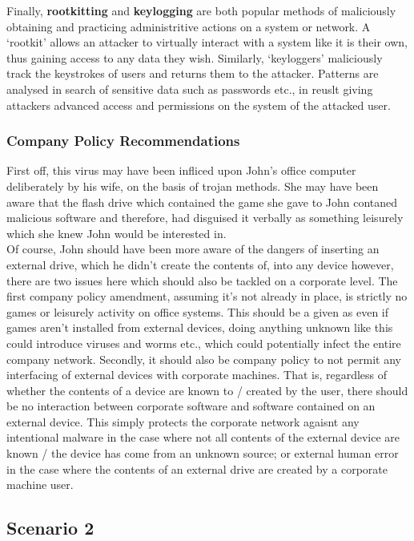 \documentclass[11pt, english]{article}
\begin{document}
	Finally, \textbf{rootkitting} and \textbf{keylogging} are both popular methods of maliciously obtaining and practicing administritive actions on a system or network. A `rootkit' allows an attacker to virtually interact with a system like it is their own, thus gaining access to any data they wish. Similarly, `keyloggers' maliciously track the keystrokes of users and returns them to the attacker. Patterns are analysed in search of sensitive data such as passwords etc., in reuslt giving attackers advanced access and permissions on the system of the attacked user.

		\subsubsection{Company Policy Recommendations}

	First off, this virus may have been infliced upon John's office computer deliberately by his wife, on the basis of trojan methods. She may have been aware that the flash drive which contained the game she gave to John contaned malicious software and therefore, had disguised it verbally as something leisurely which she knew John would be interested in.\\

	Of course, John should have been more aware of the dangers of inserting an external drive, which he didn't create the contents of, into any device however, there are two issues here which should also be tackled on a corporate level. The first company policy amendment, assuming it's not already in place, is strictly no games or leisurely activity on office systems. This should be a given as even if games aren't installed from external devices, doing anything unknown like this could introduce viruses and worms etc., which could potentially infect the entire company network. Secondly, it should also be company policy to not permit any interfacing of external devices with corporate machines. That is, regardless of whether the contents of a device are known to / created by the user, there should be no interaction between corporate software and software contained on an external device. This simply protects the corporate network agaisnt any intentional malware in the case where not all contents of the external device are known / the device has come from an unknown source; or external human error in the case where the contents of an external drive are created by a corporate machine user.

\newpage

	\subsection{Scenario 2}
\end{document}
